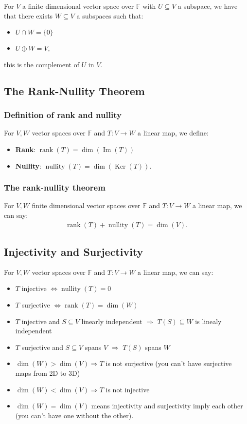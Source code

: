 \documentclass[a4paper, 12pt, twoside]{article}
\DeclareMathOperator{\Ker}{Ker}
\DeclareMathOperator{\Ima}{Im}
\DeclareMathOperator{\Rank}{rank}
\DeclareMathOperator{\Null}{nullity}
\begin{document}
For $V$ a finite dimensional vector space over $\mathbb{F}$ 
with $U \subseteq V$ a subspace, we have that there exists
$W \subseteq V$ a subspaces such that:
\begin{itemize}
  \item $U \cap W = \{0\}$
  \item $U \oplus W = V$,
\end{itemize}
this is the complement of $U$ in $V$.

\subsection{The Rank-Nullity Theorem}

\subsubsection{Definition of rank and nullity}

For $V, W$ vector spaces over $\mathbb{F}$ and $T : V \to W$ a 
linear map, we define:
\begin{itemize}
  \item \textbf{Rank}: $\Rank(T) = \dim(\Ima(T))$
  \item \textbf{Nullity}: $\Null(T) = \dim(\Ker(T))$.
\end{itemize}

\subsubsection{The rank-nullity theorem}

For $V, W$ finite dimensional vector spaces over $\mathbb{F}$ 
and $T : V \to W$ a linear map, we can say:
\begin{align*}
  \Rank(T) + \Null(T) = \dim(V).
\end{align*}

\subsection{Injectivity and Surjectivity}

For $V, W$ vector spaces over $\mathbb{F}$ and $T : V \to W$ a 
linear map, we can say:
\begin{itemize}
  \item $T$ injective $\Leftrightarrow \Null(T) = 0$
  \item $T$ surjective $\Leftrightarrow \Rank(T) = \dim(W)$
  \item $T$ injective and $S \subseteq V$ linearly independent
  $\Rightarrow$ $T(S) \subseteq W$ is linealy independent
  \item $T$ surjective and $S \subseteq V$ spans $V$ 
  $\Rightarrow$ $T(S)$ spans $W$
  \item $\dim(W) > \dim(V) \Rightarrow T$ is not surjective 
  (you can't have surjective maps from 2D to 3D)
  \item $\dim(W) < \dim(V) \Rightarrow T$ is not injective
  \item $\dim(W) = \dim(V)$ means injectivity and
  surjectivity imply each other (you can't have one without
  the other).
\end{itemize}
\end{document}
